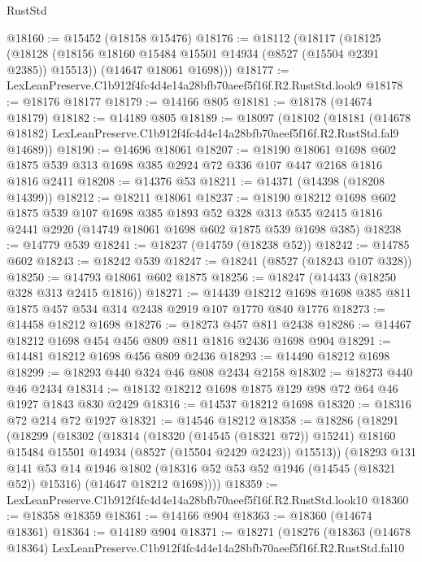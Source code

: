 \begin{lexlean}{RustStd}
\begin{coremodule}
@18160 := @15452 (@18158 @15476)
@18176 := @18112
    (@18117
      (@18125
        (@18128 (@18156 @18160 @15484 @15501 @14934 (@8527 (@15504 @2391 @2385)) @15513))
        (@14647 @18061 @1698)))
@18177 := LexLeanPreserve.C1b912f4fc4d4e14a28bfb70aeef5f16f.R2.RustStd.look9
@18178 := @18176 @18177
@18179 := @14166 @805
@18181 := @18178 (@14674 @18179)
@18182 := @14189 @805
@18189 := @18097
    (@18102
      (@18181
        (@14678 @18182)
        LexLeanPreserve.C1b912f4fc4d4e14a28bfb70aeef5f16f.R2.RustStd.fal9
        @14689))
@18190 := @14696 @18061
@18207 := @18190
    @18061
    @1698
    @602
    @1875
    @539
    @313
    @1698
    @385
    @2924
    @72
    @336
    @107
    @447
    @2168
    @1816
    @1816
    @2411
@18208 := @14376 @53
@18211 := @14371 (@14398 (@18208 @14399))
@18212 := @18211 @18061
@18237 := @18190
    @18212
    @1698
    @602
    @1875
    @539
    @107
    @1698
    @385
    @1893
    @52
    @328
    @313
    @535
    @2415
    @1816
    @2441
    @2920
    (@14749 @18061 @1698 @602 @1875 @539 @1698 @385)
@18238 := @14779 @539
@18241 := @18237 (@14759 (@18238 @52))
@18242 := @14785 @602
@18243 := @18242 @539
@18247 := @18241 (@8527 (@18243 @107 @328))
@18250 := @14793 @18061 @602 @1875
@18256 := @18247 (@14433 (@18250 @328 @313 @2415 @1816))
@18271 := @14439 @18212 @1698 @1698 @385 @811 @1875 @457 @534 @314 @2438 @2919 @107 @1770 @840 @1776
@18273 := @14458 @18212 @1698
@18276 := @18273 @457 @811 @2438
@18286 := @14467 @18212 @1698 @454 @456 @809 @811 @1816 @2436 @1698 @904
@18291 := @14481 @18212 @1698 @456 @809 @2436
@18293 := @14490 @18212 @1698
@18299 := @18293 @440 @324 @46 @808 @2434 @2158
@18302 := @18273 @440 @46 @2434
@18314 := @18132 @18212 @1698 @1875 @129 @98 @72 @64 @46 @1927 @1843 @830 @2429
@18316 := @14537 @18212 @1698
@18320 := @18316 @72 @214 @72 @1927
@18321 := @14546 @18212
@18358 := @18286
    (@18291
      (@18299
        (@18302
          (@18314
            (@18320 (@14545 (@18321 @72)) @15241)
            @18160
            @15484
            @15501
            @14934
            (@8527 (@15504 @2429 @2423))
            @15513))
        (@18293
          @131
          @141
          @53
          @14
          @1946
          @1802
          (@18316 @52 @53 @52 @1946 (@14545 (@18321 @52)) @15316)
          (@14647 @18212 @1698))))
@18359 := LexLeanPreserve.C1b912f4fc4d4e14a28bfb70aeef5f16f.R2.RustStd.look10
@18360 := @18358 @18359
@18361 := @14166 @904
@18363 := @18360 (@14674 @18361)
@18364 := @14189 @904
@18371 := @18271
    (@18276
      (@18363
        (@14678 @18364)
        LexLeanPreserve.C1b912f4fc4d4e14a28bfb70aeef5f16f.R2.RustStd.fal10

\end{coremodule}
\end{lexlean}

